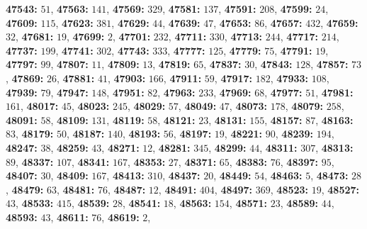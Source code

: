 \textsf{\bfseries 47543:} $51$, \textsf{\bfseries 47563:} $141$, \textsf{\bfseries 47569:} $329$, \textsf{\bfseries 47581:} $137$, \textsf{\bfseries 47591:} $208$, \textsf{\bfseries 47599:} $24$, \textsf{\bfseries 47609:} $115$, \textsf{\bfseries 47623:} $381$, \textsf{\bfseries 47629:} $44$, \textsf{\bfseries 47639:} $47$, \textsf{\bfseries 47653:} $86$, \textsf{\bfseries 47657:} $432$, \textsf{\bfseries 47659:} $32$, \textsf{\bfseries 47681:} $19$, \textsf{\bfseries 47699:} $2$, \textsf{\bfseries 47701:} $232$, \textsf{\bfseries 47711:} $330$, \textsf{\bfseries 47713:} $244$, \textsf{\bfseries 47717:} $214$, \textsf{\bfseries 47737:} $199$, \textsf{\bfseries 47741:} $302$, \textsf{\bfseries 47743:} $333$, \textsf{\bfseries 47777:} $125$, \textsf{\bfseries 47779:} $75$, \textsf{\bfseries 47791:} $19$, \textsf{\bfseries 47797:} $99$, \textsf{\bfseries 47807:} $11$, \textsf{\bfseries 47809:} $13$, \textsf{\bfseries 47819:} $65$, \textsf{\bfseries 47837:} $30$, \textsf{\bfseries 47843:} $128$, \textsf{\bfseries 47857:} $73$, \textsf{\bfseries 47869:} $26$, \textsf{\bfseries 47881:} $41$, \textsf{\bfseries 47903:} $166$, \textsf{\bfseries 47911:} $59$, \textsf{\bfseries 47917:} $182$, \textsf{\bfseries 47933:} $108$, \textsf{\bfseries 47939:} $79$, \textsf{\bfseries 47947:} $148$, \textsf{\bfseries 47951:} $82$, \textsf{\bfseries 47963:} $233$, \textsf{\bfseries 47969:} $68$, \textsf{\bfseries 47977:} $51$, \textsf{\bfseries 47981:} $161$, \textsf{\bfseries 48017:} $45$, \textsf{\bfseries 48023:} $245$, \textsf{\bfseries 48029:} $57$, \textsf{\bfseries 48049:} $47$, \textsf{\bfseries 48073:} $178$, \textsf{\bfseries 48079:} $258$, \textsf{\bfseries 48091:} $58$, \textsf{\bfseries 48109:} $131$, \textsf{\bfseries 48119:} $58$, \textsf{\bfseries 48121:} $23$, \textsf{\bfseries 48131:} $155$, \textsf{\bfseries 48157:} $87$, \textsf{\bfseries 48163:} $83$, \textsf{\bfseries 48179:} $50$, \textsf{\bfseries 48187:} $140$, \textsf{\bfseries 48193:} $56$, \textsf{\bfseries 48197:} $19$, \textsf{\bfseries 48221:} $90$, \textsf{\bfseries 48239:} $194$, \textsf{\bfseries 48247:} $38$, \textsf{\bfseries 48259:} $43$, \textsf{\bfseries 48271:} $12$, \textsf{\bfseries 48281:} $345$, \textsf{\bfseries 48299:} $44$, \textsf{\bfseries 48311:} $307$, \textsf{\bfseries 48313:} $89$, \textsf{\bfseries 48337:} $107$, \textsf{\bfseries 48341:} $167$, \textsf{\bfseries 48353:} $27$, \textsf{\bfseries 48371:} $65$, \textsf{\bfseries 48383:} $76$, \textsf{\bfseries 48397:} $95$, \textsf{\bfseries 48407:} $30$, \textsf{\bfseries 48409:} $167$, \textsf{\bfseries 48413:} $310$, \textsf{\bfseries 48437:} $20$, \textsf{\bfseries 48449:} $54$, \textsf{\bfseries 48463:} $5$, \textsf{\bfseries 48473:} $28$, \textsf{\bfseries 48479:} $63$, \textsf{\bfseries 48481:} $76$, \textsf{\bfseries 48487:} $12$, \textsf{\bfseries 48491:} $404$, \textsf{\bfseries 48497:} $369$, \textsf{\bfseries 48523:} $19$, \textsf{\bfseries 48527:} $43$, \textsf{\bfseries 48533:} $415$, \textsf{\bfseries 48539:} $28$, \textsf{\bfseries 48541:} $18$, \textsf{\bfseries 48563:} $154$, \textsf{\bfseries 48571:} $23$, \textsf{\bfseries 48589:} $44$, \textsf{\bfseries 48593:} $43$, \textsf{\bfseries 48611:} $76$, \textsf{\bfseries 48619:} $2$, 

